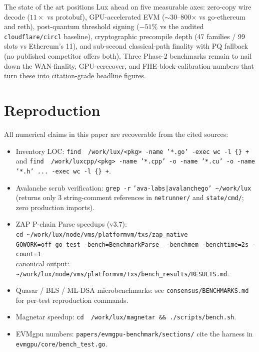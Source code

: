 \documentclass[11pt,a4paper]{article}
\begin{document}
The state of the art positions Lux ahead on five measurable axes:
zero-copy wire decode ($11\times$ vs protobuf), GPU-accelerated EVM
($\sim$30--800$\times$ vs go-ethereum and reth), post-quantum
threshold signing ($-51\%$ vs the audited \texttt{cloudflare/circl}
baseline), cryptographic precompile depth (47 families / 99 slots vs
Ethereum's 11), and
sub-second classical-path finality with PQ fallback (no published
competitor offers both). Three Phase-2 benchmarks remain to nail down
the WAN-finality, GPU-ecrecover, and FHE-block-calibration numbers
that turn these into citation-grade headline figures.

\appendix

\section*{Reproduction}

All numerical claims in this paper are recoverable from the cited
sources:

\begin{itemize}[leftmargin=1.4em,topsep=0.2em,itemsep=0.1em]
  \item Inventory LOC: \texttt{find ~/work/lux/<pkg> -name '*.go' -exec wc -l \{\} +}
        and \texttt{find ~/work/luxcpp/<pkg> -name '*.cpp' -o -name '*.cu' -o
        -name '*.h' ... -exec wc -l \{\} +}.
  \item Avalanche scrub verification: \texttt{grep -r}
        \texttt{'ava-labs|avalanchego' \textasciitilde/work/lux} (returns
        only 3 string-comment references in \texttt{netrunner/} and
        \texttt{state/cmd/}; zero production imports).
  \item ZAP P-chain Parse speedups (v3.7):\\
        \texttt{cd \textasciitilde/work/lux/node/vms/platformvm/txs/zap\_native}\\
        \texttt{GOWORK=off go test -bench=BenchmarkParse\_ -benchmem -benchtime=2s -count=1}\\
        canonical output:
        \texttt{\textasciitilde/work/lux/node/vms/platformvm/txs/bench\_results/RESULTS.md}.
  \item Quasar / BLS / ML-DSA microbenchmarks: see
        \texttt{consensus/BENCHMARKS.md} for per-test reproduction
        commands.
  \item Magnetar speedup: \texttt{cd ~/work/lux/magnetar \&\& ./scripts/bench.sh}.
  \item EVMgpu numbers: \texttt{papers/evmgpu-benchmark/sections/} cite
        the harness in \texttt{evmgpu/core/bench\_test.go}.
\end{itemize}
\end{document}
